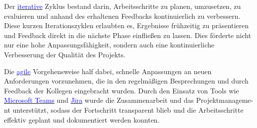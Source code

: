 Der \hyperlink{iterativ}{\textcolor{blue}{iterative}} Zyklus bestand darin, Arbeitsschritte zu planen, umzusetzen, zu evaluieren und anhand des erhaltenen Feedbacks kontinuierlich zu verbessern. Diese kurzen Iterationszyklen erlaubten es, Ergebnisse frühzeitig zu präsentieren und Feedback direkt in die nächste Phase einfließen zu lassen. Dies förderte nicht nur eine hohe Anpassungsfähigkeit, sondern auch eine kontinuierliche Verbesserung der Qualität des Projekts.

Die \hyperlink{agil}{\textcolor{blue}{agile}} Vorgehensweise half dabei, schnelle Anpassungen an neuen Anforderungen vorzunehmen, die in den regelmäßigen Besprechungen und durch Feedback der Kollegen eingebracht wurden. Durch den Einsatz von Tools wie \hyperlink{MicrosoftTeams}{\textcolor{blue}{Microsoft Teams}} und \hyperlink{Jira}{\textcolor{blue}{Jira}} wurde die Zusammenarbeit und das Projektmanageme-
nt unterstützt, sodass der Fortschritt transparent blieb und die Arbeitsschritte effektiv geplant und dokumentiert werden konnten.
